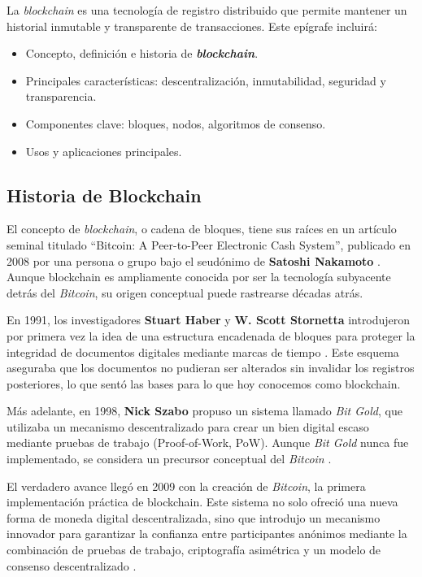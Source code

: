 La \textit{blockchain} es una tecnología de registro distribuido que permite mantener un historial inmutable y transparente de transacciones. Este epígrafe incluirá:

\begin{itemize}
    \item Concepto, definición e historia de \textit{\textbf{blockchain}}.
    \item Principales características: descentralización, inmutabilidad, seguridad y transparencia.
    \item Componentes clave: bloques, nodos, algoritmos de consenso.
    \item Usos y aplicaciones principales.
\end{itemize}

\subsection{Historia de Blockchain}

El concepto de \textit{blockchain}, o cadena de bloques, tiene sus raíces en un artículo seminal titulado ``Bitcoin: A Peer-to-Peer Electronic Cash System'', publicado en 2008 por una persona o grupo bajo el seudónimo de \textbf{Satoshi Nakamoto} \cite{nakamoto2008bitcoin}. Aunque blockchain es ampliamente conocida por ser la tecnología subyacente detrás del \textit{Bitcoin}, su origen conceptual puede rastrearse décadas atrás.

En 1991, los investigadores \textbf{Stuart Haber} y \textbf{W. Scott Stornetta} introdujeron por primera vez la idea de una estructura encadenada de bloques para proteger la integridad de documentos digitales mediante marcas de tiempo \cite{haber1991timestamping}. Este esquema aseguraba que los documentos no pudieran ser alterados sin invalidar los registros posteriores, lo que sentó las bases para lo que hoy conocemos como blockchain.

Más adelante, en 1998, \textbf{Nick Szabo} propuso un sistema llamado \textit{Bit Gold}, que utilizaba un mecanismo descentralizado para crear un bien digital escaso mediante pruebas de trabajo (Proof-of-Work, PoW). Aunque \textit{Bit Gold} nunca fue implementado, se considera un precursor conceptual del \textit{Bitcoin} \cite{szabo1998bitgold}.

El verdadero avance llegó en 2009 con la creación de \textit{Bitcoin}, la primera implementación práctica de blockchain. Este sistema no solo ofreció una nueva forma de moneda digital descentralizada, sino que introdujo un mecanismo innovador para garantizar la confianza entre participantes anónimos mediante la combinación de pruebas de trabajo, criptografía asimétrica y un modelo de consenso descentralizado \cite{nakamoto2008bitcoin}.

